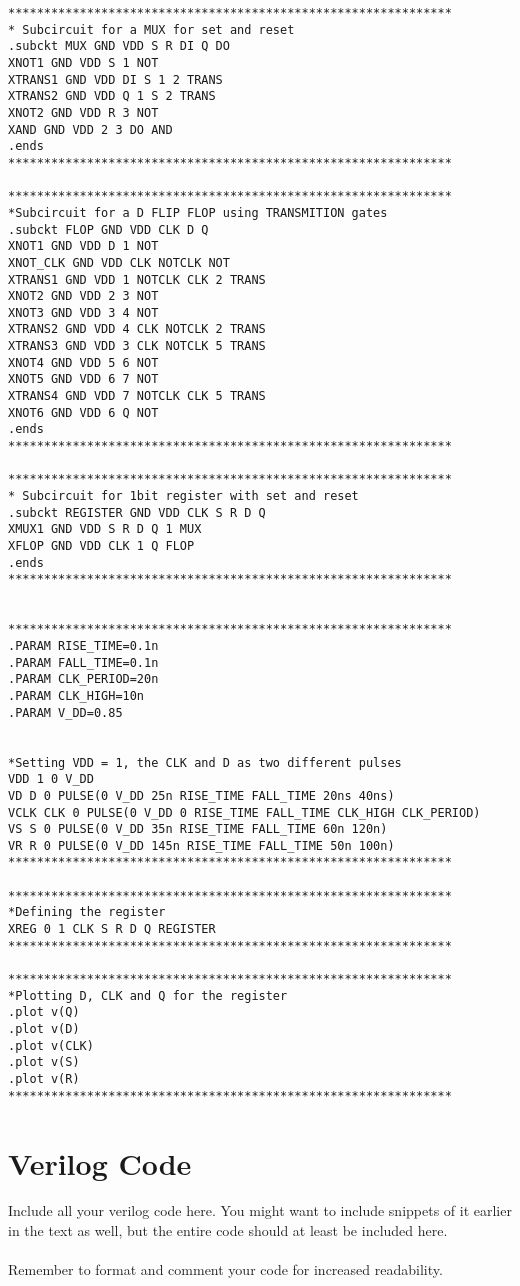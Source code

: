 \begin{lstlisting}[style=aimspiceStyle, caption=1-bit register in AIMSPICE, label=testcode]
**************************************************************
* Subcircuit for a MUX for set and reset
.subckt MUX GND VDD S R DI Q DO
XNOT1 GND VDD S 1 NOT
XTRANS1 GND VDD DI S 1 2 TRANS
XTRANS2 GND VDD Q 1 S 2 TRANS
XNOT2 GND VDD R 3 NOT
XAND GND VDD 2 3 DO AND
.ends 
**************************************************************

**************************************************************
*Subcircuit for a D FLIP FLOP using TRANSMITION gates 
.subckt FLOP GND VDD CLK D Q 
XNOT1 GND VDD D 1 NOT
XNOT_CLK GND VDD CLK NOTCLK NOT
XTRANS1 GND VDD 1 NOTCLK CLK 2 TRANS
XNOT2 GND VDD 2 3 NOT
XNOT3 GND VDD 3 4 NOT 
XTRANS2 GND VDD 4 CLK NOTCLK 2 TRANS
XTRANS3 GND VDD 3 CLK NOTCLK 5 TRANS
XNOT4 GND VDD 5 6 NOT
XNOT5 GND VDD 6 7 NOT
XTRANS4 GND VDD 7 NOTCLK CLK 5 TRANS
XNOT6 GND VDD 6 Q NOT
.ends
**************************************************************

**************************************************************
* Subcircuit for 1bit register with set and reset
.subckt REGISTER GND VDD CLK S R D Q 
XMUX1 GND VDD S R D Q 1 MUX
XFLOP GND VDD CLK 1 Q FLOP
.ends
**************************************************************


**************************************************************
.PARAM RISE_TIME=0.1n 
.PARAM FALL_TIME=0.1n 
.PARAM CLK_PERIOD=20n 
.PARAM CLK_HIGH=10n 
.PARAM V_DD=0.85


*Setting VDD = 1, the CLK and D as two different pulses
VDD 1 0 V_DD
VD D 0 PULSE(0 V_DD 25n RISE_TIME FALL_TIME 20ns 40ns)
VCLK CLK 0 PULSE(0 V_DD 0 RISE_TIME FALL_TIME CLK_HIGH CLK_PERIOD)
VS S 0 PULSE(0 V_DD 35n RISE_TIME FALL_TIME 60n 120n)
VR R 0 PULSE(0 V_DD 145n RISE_TIME FALL_TIME 50n 100n)
**************************************************************

**************************************************************
*Defining the register
XREG 0 1 CLK S R D Q REGISTER
**************************************************************

**************************************************************
*Plotting D, CLK and Q for the register
.plot v(Q)
.plot v(D)
.plot v(CLK)
.plot v(S) 
.plot v(R)
**************************************************************

\end{lstlisting}


\section{Verilog Code}
Include all your verilog code here. You might want to include snippets of it earlier in the text as well, but the entire code should at least be included here.
\\ \\
Remember to format and comment your code for increased readability.

